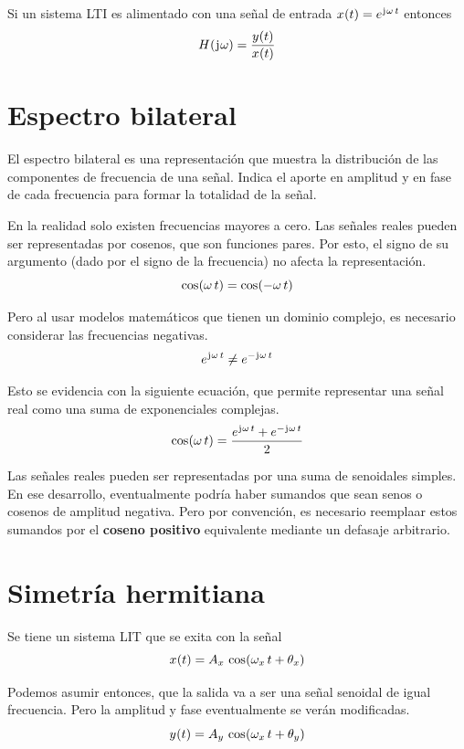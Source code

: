 \begin{mdframed}[style=PropertyFrame]
    \begin{prop}
    \end{prop}
    Si un sistema LTI es alimentado con una señal de entrada $\fx[x]{t} = e^{\iu \omega \, t}$ entonces
    \[
        \fx[H]{\iu \omega} = \frac{\fx[y]{t}}{\fx[x]{t}}
    \]
\end{mdframed}

\section{Espectro bilateral}

El espectro bilateral es una representación que muestra la distribución de las componentes de frecuencia de una señal.
Indica el aporte en amplitud y en fase de cada frecuencia para formar la totalidad de la señal.

En la realidad solo existen frecuencias mayores a cero.
Las señales reales pueden ser representadas por cosenos, que son funciones pares.
Por esto, el signo de su argumento (dado por el signo de la frecuencia) no afecta la representación.
\[
    \fx[\cos]{\omega \, t} = \fx[\cos]{- \omega \, t}
\]

Pero al usar modelos matemáticos que tienen un dominio complejo, es necesario considerar las frecuencias negativas.
\[
    e^{\iu \omega \, t} \neq e^{- \iu \omega \, t}
\]

Esto se evidencia con la siguiente ecuación, que permite representar una señal real como una suma de exponenciales complejas.
\[
    \fx[\cos]{\omega \, t} = \frac{e^{\iu \omega \, t} + e^{- \iu \omega \, t}}{2}
\]

Las señales reales pueden ser representadas por una suma de senoidales simples.
En ese desarrollo, eventualmente podría haber sumandos que sean senos o cosenos de amplitud negativa.
Pero por convención, es necesario reemplaar estos sumandos por el \textbf{coseno positivo} equivalente mediante un defasaje arbitrario.

\section{Simetría hermitiana}

Se tiene un sistema LIT que se exita con la señal
\[
    \fx[x]{t} = A_x \, \fx[\cos]{\omega_x \, t + \theta_x}
\]

Podemos asumir entonces, que la salida va a ser una señal senoidal de igual frecuencia.
Pero la amplitud y fase eventualmente se verán modificadas.
\[
    \fx[y]{t} = A_y \, \fx[\cos]{\omega_x \, t + \theta_y}
\]

